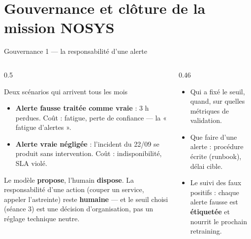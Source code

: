 \section{Gouvernance et clôture de la mission NOSYS}

\begin{frame}{Gouvernance 1 --- la responsabilité d'une alerte}
\small
\begin{columns}[t]
\begin{column}{0.5\textwidth}
\footnotesize\begin{block}{Deux scénarios qui arrivent tous les mois}
\begin{itemize}
\item \textbf{Alerte fausse traitée comme vraie} : 3 h perdues. Coût : fatigue, perte de confiance --- la « fatigue d'alertes ».
\item \textbf{Alerte vraie négligée} : l'incident du 22/09 se produit sans
intervention. Coût : indisponibilité, SLA violé.
\end{itemize}
\end{block}
\begin{wbox}
Le modèle \textbf{propose}, l'humain \textbf{dispose}. La responsabilité
d'une action (couper un service, appeler l'astreinte) reste
\textbf{humaine} --- et le seuil choisi (séance 3) est une décision
d'organisation, pas un réglage technique neutre.
\end{wbox}
\end{column}
\begin{column}{0.46\textwidth}
\begin{ebox}
\begin{itemize}
\item Qui a fixé le seuil, quand, sur quelles métriques de validation.
\item Que faire d'une alerte : procédure écrite (runbook), délai cible.
\item Le suivi des faux positifs : chaque alerte fausse est
\textbf{étiquetée} et nourrit le prochain retraining.
\end{itemize}
\end{ebox}
\end{column}
\end{columns}
\end{frame}

